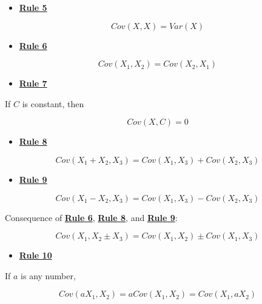 \documentclass[
]{book}
\providecommand{\tightlist}{%
  \setlength{\itemsep}{0pt}\setlength{\parskip}{0pt}}
\begin{document}
\begin{itemize}
\tightlist
\item
  \href{./covariance.html\#Rule5}{\textbf{Rule 5}}
\end{itemize}

\[
Cov(X, X) = Var(X)
\]

\begin{itemize}
\tightlist
\item
  \href{./covariance.html\#Rule6}{\textbf{Rule 6}}
\end{itemize}

\[
Cov\left(X_{1}, X_{2}\right) = Cov\left(X_{2}, X_{1}\right)
\]

\begin{itemize}
\tightlist
\item
  \href{./covariance.html\#Rule7}{\textbf{Rule 7}}
\end{itemize}

If \(C\) is constant, then

\[
Cov\left(X, C\right) = 0
\]

\begin{itemize}
\tightlist
\item
  \href{./covariance.html\#Rule8}{\textbf{Rule 8}}
\end{itemize}

\[
Cov\left(X_{1} + X_{2}, X_{3}\right) = Cov\left(X_{1}, X_{3}\right) + Cov\left(X_{2}, X_{3}\right)  
\]

\begin{itemize}
\tightlist
\item
  \href{./covariance.html\#Rule9}{\textbf{Rule 9}}
\end{itemize}

\[
Cov\left(X_{1} - X_{2}, X_{3}\right) = Cov\left(X_{1}, X_{3}\right) - Cov\left(X_{2}, X_{3}\right)  
\]

Consequence of \href{./covariance.html\#Rule6}{\textbf{Rule 6}}, \href{./covariance.html\#Rule8}{\textbf{Rule 8}}, and \href{./covariance.html\#Rule9}{\textbf{Rule 9}}:

\[
Cov\left(X_{1}, X_{2} \pm X_{3}\right) = Cov\left(X_{1}, X_{2}\right) \pm Cov\left(X_{1}, X_{3}\right)  
\]

\begin{itemize}
\tightlist
\item
  \href{./covariance.html\#Rule10}{\textbf{Rule 10}}
\end{itemize}

If \(a\) is any number,

\[
Cov\left(a X_{1}, X_{2}\right) = a Cov\left(X_{1}, X_{2}\right) =  Cov\left(X_{1}, a X_{2}\right)  
\]
\end{document}

